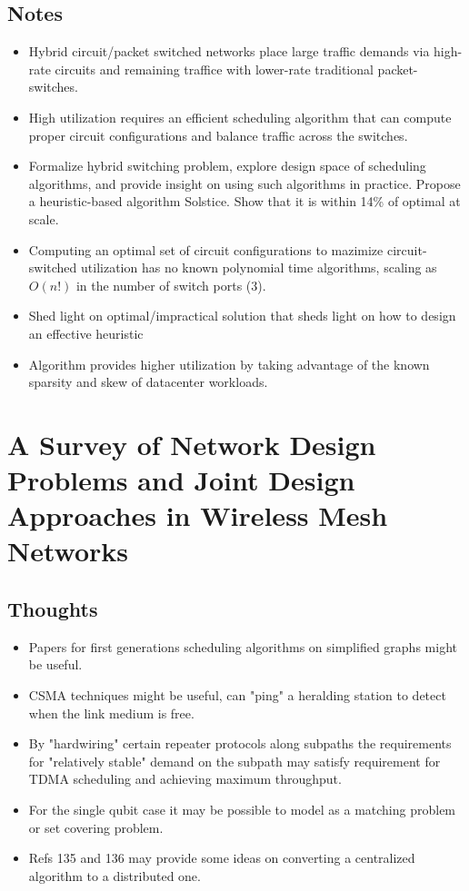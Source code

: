 \documentclass{article}
\begin{document}
\subsection{Notes}
\begin{itemize}
    \item Hybrid circuit/packet switched networks place large traffic demands via high-rate circuits and remaining traffice with lower-rate traditional packet-switches.
    \item High utilization requires an efficient scheduling algorithm that can compute proper circuit configurations and balance traffic across the switches.
    \item Formalize hybrid switching problem, explore design space of scheduling algorithms, and provide insight on using such algorithms in practice.  Propose a heuristic-based algorithm Solstice.  Show that it is within 14\% of optimal at scale.
    \item Computing an optimal set of circuit configurations to mazimize circuit-switched utilization has no known polynomial time algorithms, scaling as $O(n!)$ in the number of switch ports (3).
    \item Shed light on optimal/impractical solution that sheds light on how to design an effective heuristic
    \item Algorithm provides higher utilization by taking advantage of the known sparsity and skew of datacenter workloads.
\end{itemize}


\section{A Survey of Network Design Problems and Joint Design Approaches in Wireless Mesh Networks}

\subsection{Thoughts}
\begin{itemize}
    \item Papers for first generations scheduling algorithms on simplified graphs might be useful.
    \item CSMA techniques might be useful, can "ping" a heralding station to detect when the link medium is free.
    \item By "hardwiring" certain repeater protocols along subpaths the requirements for "relatively stable" demand on the subpath may satisfy requirement for TDMA scheduling and achieving maximum throughput.
    \item For the single qubit case it may be possible to model as a matching problem or set covering problem.
    \item Refs 135 and 136 may provide some ideas on converting a centralized algorithm to a distributed one.
\end{itemize}
\end{document}
